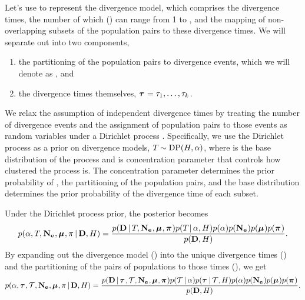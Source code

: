 Let's use \divtimemodel to represent the divergence model, which comprises
the divergence times, the number of which (\nevents) can range from 1 to
\ncomparisons, and the mapping of non-overlapping subsets of the population
pairs to these \nevents divergence times.
We will separate out \divtimemodel into two components,
\begin{enumerate}
    \item the partitioning of the \ncomparisons population pairs to
        divergence events, which we will denote as \divtimesets, and
    \item the divergence times themselves,
        $\divtimes = \divtime[1], \ldots, \divtime[\nevents]$.
\end{enumerate}
We relax the assumption of independent divergence times by treating the number
of divergence events and the assignment of population pairs to those events as
random variables under a Dirichlet process \citep{Ferguson1973,
    Antoniak1974}.
Specifically, we use the Dirichlet process as a prior on divergence models,
$\divtimemodel \sim \dirp(\basedistribution, \concentration)$, where
\basedistribution is the base distribution of the process and \concentration is
concentration parameter that controls how clustered the process is.
The concentration parameter determines the prior probability of \divtimesets,
the partitioning of the population pairs, and the base distribution determines
the prior probability of the divergence time of each subset.

Under the Dirichlet process prior, the posterior becomes
\begin{equation}
    \pr(
    \concentration,
    \divtimemodel,
    \collectionpopsizes,
    \murates,
    \gfreq
    \given
    \alldata,
    \basedistribution
    )
    =
    \frac{
        \pr(
        \alldata
        \given
        \divtimemodel,
        \collectionpopsizes,
        \murates,
        \gfreqs
        )
        \pr(\divtimemodel \given \concentration, \basedistribution)
        \pr(\concentration)
        \pr(\collectionpopsizes)
        \pr(\murates)
        \pr(\gfreqs)
    }{
        \pr(
        \alldata,
        \basedistribution
        )
    }.
    \label{eq:bayesrule}
\end{equation}
By expanding out the divergence model (\divtimemodel) into the unique
divergence times (\divtimes) and the partitioning of the pairs of populations
to those times (\divtimesets), we get
\begin{equation}
    \pr(
    \concentration,
    \divtimes,
    \divtimesets,
    \collectionpopsizes,
    \murates,
    \gfreq
    \given
    \alldata,
    \basedistribution
    )
    =
    \frac{
        \pr(
        \alldata
        \given
        \divtimes,
        \divtimesets,
        \collectionpopsizes,
        \murates,
        \gfreqs
        )
        \pr(\divtimesets \given \concentration)
        \pr(\divtimes \given \divtimesets, \basedistribution)
        \pr(\concentration)
        \pr(\collectionpopsizes)
        \pr(\murates)
        \pr(\gfreqs)
    }{
        \pr(
        \alldata,
        \basedistribution
        )
    }.
    \label{eq:bayesruleexpanded}
\end{equation}

